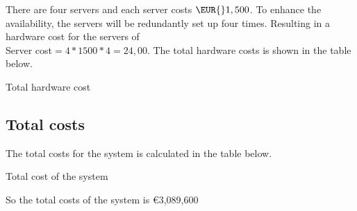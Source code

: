 There are four servers and each server costs $\EUR{}1,500$. To enhance the availability, the servers will be redundantly set up four times. Resulting in a hardware cost for the servers of\\
Server cost$=4*1500*4=24,00$. 
The total hardware costs is shown in the table below.
\begin{table}[H]
\caption{Total hardware cost}
\label{table:total-hardw-cost}
\end{table}

\subsection{Total costs}
The total costs for the system is calculated in the table below.\\
\newline
\begin{table}[H]
\caption{Total cost of the system}
\label{table:totalcosts}
\end{table}
So the total costs of the system is \euro{}3,089,600\\

